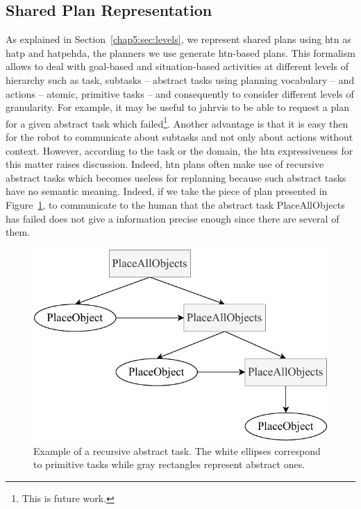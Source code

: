 \documentclass[a4paper,11pt,twoside]{StyleThese}
\begin{document}
\subsection{Shared Plan Representation}\label{chap6:subsec:shared_p_rep}
As explained in Section~\ref{chap5:sec:levels}, we represent shared plans using \acrfull{htn} as \acrshort{hatp} and \acrshort{hatpehda}, the planners we use generate \acrshort{htn}-based plans. This formalism allows to deal with goal-based and situation-based activities at different levels of hierarchy such as task, subtasks -- abstract tasks using planning vocabulary -- and actions -- atomic, primitive tasks -- and consequently to consider different levels of granularity. For example, it may be useful to \acrshort{jahrvis} to be able to request a plan for a given abstract task which failed\footnote{This is future work.}. Another advantage is that it is easy then for the robot to communicate about subtasks and not only about actions without context. However, according to the task or the domain, the \acrshort{htn} expressiveness for this matter raises discussion. Indeed, \acrshort{htn} plans often make use of recursive abstract tasks which becomes useless for replanning because such abstract tasks have no semantic meaning. Indeed, if we take the piece of plan presented in Figure~\ref{chap6:fig:recursive_task}, to communicate to the human that the abstract task PlaceAllObjects has failed does not give a information precise enough since there are several of them.

\begin{figure}[!ht]
	\centering
	\includegraphics[width=0.6\linewidth]{figures/chapter2/recursive_task.pdf}
	\caption{Example of a recursive abstract task. The white ellipses correspond to primitive tasks while gray rectangles represent abstract ones.}
	\label{chap6:fig:recursive_task}
\end{figure}
\end{document}
